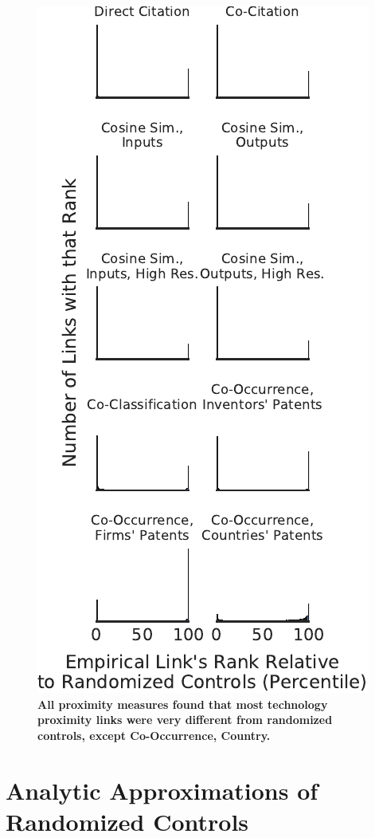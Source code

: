 \documentclass[]{svjour3}
\begin{document}
\begin{figure}[h]
\centering
\includegraphics[width=.7\textwidth]{figs/Country_CoOccurence_Histograms_IPC.pdf} 
\caption{\textbf{All proximity measures found that most technology proximity links were very different from randomized controls, except Co-Occurrence, Country.}}\label{p_value_histograms}
\end{figure}

\section{Analytic Approximations of Randomized Controls}\label{analytic_approximations}
\end{document}
